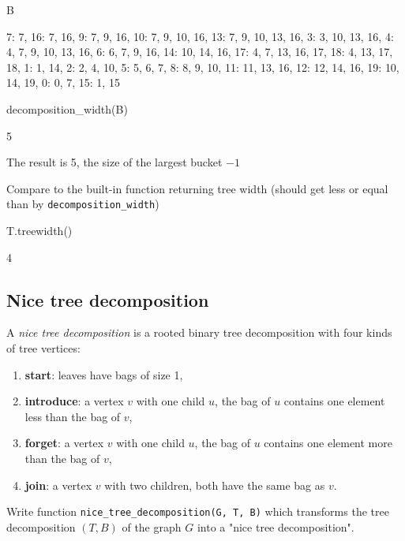 \begin{sageCell}
    B
\end{sageCell}
\begin{outCell}
    {7: {7},
     16: {7, 16},
     9: {7, 9, 16},
     10: {7, 9, 10, 16},
     13: {7, 9, 10, 13, 16},
     3: {3, 10, 13, 16},
     4: {4, 7, 9, 10, 13, 16},
     6: {6, 7, 9, 16},
     14: {10, 14, 16},
     17: {4, 7, 13, 16, 17},
     18: {4, 13, 17, 18},
     1: {1, 14},
     2: {2, 4, 10},
     5: {5, 6, 7},
     8: {8, 9, 10},
     11: {11, 13, 16},
     12: {12, 14, 16},
     19: {10, 14, 19},
     0: {0, 7},
     15: {1, 15}}
\end{outCell}

\begin{sageCell}
    decomposition_width(B)
\end{sageCell}
\begin{outCell}
    5
\end{outCell}
The result is 5, the size of the largest bucket $-1$

Compare to the built-in function returning tree width (should get less or equal than by \verb`decomposition_width`)
\begin{sageCell}
    T.treewidth()
\end{sageCell}
\begin{outCell}
    4
\end{outCell}


\subsection{Nice tree decomposition}

A \emph{nice tree decomposition} is a rooted binary tree decomposition with four kinds of tree vertices:
\begin{enumerate}
    \item \textbf{start}: leaves have bags of size 1,
    \item \textbf{introduce}: a vertex $v$ with one child $u$, the bag of $u$ contains one element less than the bag of $v$,
    \item \textbf{forget}:  a vertex $v$ with one child $u$, the bag of $u$ contains one element more than the bag of $v$,
    \item \textbf{join}: a vertex $v$ with two children, both have the same bag as $v$.
\end{enumerate}
Write function \verb`nice_tree_decomposition(G, T, B)` which transforms the tree decomposition $(T, B)$ of the graph $G$ into a "nice tree decomposition".

